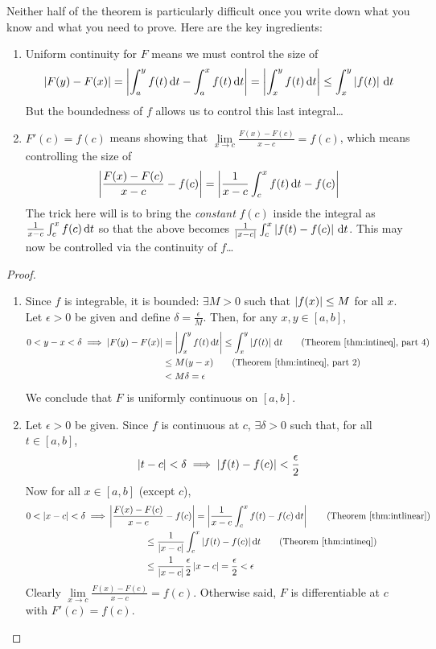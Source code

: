 \goodbreak


 Neither half of the theorem is particularly difficult once you write down what you know and what you need to prove. Here are the key ingredients:

\begin{enumerate}
  \item Uniform continuity for $F$ means we must control the size of
  \[
  	\left| F(y)-F(x)\right|
  	=\left| \int_a^yf(t)\,{\mathrm{d} t}-\int_a^xf(t)\,{\mathrm{d} t}\right|
  	=\left| \int_x^yf(t)\,{\mathrm{d} t}\right|\le \int_x^y\left| f(t)\right|\,{\mathrm{d} t}
  \]
  But the boundedness of $f$ allows us to control this last integral\ldots
  
  \item $F'(c)=f(c)$ means showing that $\lim\limits_{x\to c}\frac{F(x)-F(c)}{x-c}=f(c)$, which means controlling the size of
  \[
  	\left| \frac{F(x)-F(c)}{x-c}-f(c)\right| =\left| \frac 1{x-c}\int_{c}^xf(t)\,{\mathrm{d} t}-f(c)\right|
  \]
  The trick here will is to bring the \emph{constant} $f(c)$ inside the integral as $\frac 1{x-c}\int_c^xf(c)\,{\mathrm{d} t}$ so that the above becomes $\frac 1{\left| x-c\right|}\int_c^x\left| f(t)-f(c)\right|\,{\mathrm{d} t}$. This may now be controlled via the continuity of $f$\ldots
\end{enumerate}

\begin{proof}
	\begin{enumerate}
	  \item Since $f$ is integrable, it is bounded: $\exists M>0$ such that $\left| f(x)\right|\le M$ for all $x$.\smallbreak
		Let $\epsilon>0$ be given and define $\delta=\frac{\epsilon}M$. Then, for any $x,y\in[a,b]$,
		\begin{align*}
			0<y-x<\delta \implies \nm{F(y)-F(x)}
			&=\nm{\int_x^yf(t)\,\dt}
				\le \int_x^y\nm{f(t)}\,\dt 
				\tag{Theorem \ref{thm:intineq}, part 4}\\
			&\le M(y-x) \tag{Theorem \ref{thm:intineq}, part 2}\\
			&<M\delta =\epsilon
		\end{align*}
		We conclude that $F$ is uniformly continuous on $[a,b]$.
		
		\item Let $\epsilon>0$ be given. Since $f$ is continuous at $c$, $\exists\delta>0$ such that, for all $t\in[a,b]$,
		\[
			\left| t-c\right|<\delta \implies \left| f(t)-f(c)\right|<\frac\epsilon 2
		\]
		Now for all $x\in[a,b]$ (except $c$),
		\begin{align*}
			0<\nm{x-c}<\delta\implies 
			&\nm{\frac{F(x)-F(c)}{x-c}-f(c)} 
				=\nm{\frac 1{x-c}\int_{c}^xf(t)-f(c)\,\dt} 
				\tag{Theorem \ref{thm:intlinear}}\\
			&\qquad\qquad\le\frac 1{\nm{x-c}}\int_{c}^x\nm{f(t)-f(c)}\dt 
				\tag{Theorem \ref{thm:intineq}}\\
			&\qquad\qquad\le\frac 1{\nm{x-c}}\frac\epsilon 2\nm{x-c}
				=\frac\epsilon 2<\epsilon
		\end{align*}
		Clearly $\lim\limits_{x\to c}\frac{F(x)-F(c)}{x-c}=f(c)$. Otherwise said, $F$ is differentiable at $c$ with $F'(c)=f(c)$.\qedhere
	\end{enumerate}
\end{proof}


